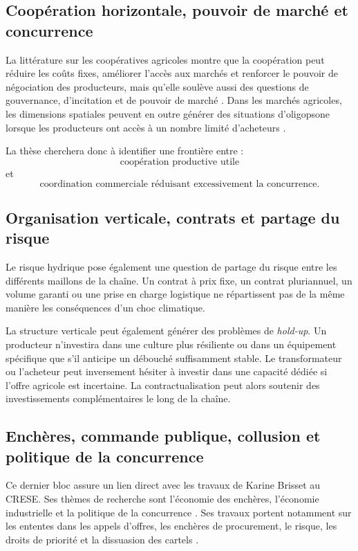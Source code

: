 \documentclass[11pt,a4paper]{article}
\begin{document}
\subsection*{Coopération horizontale, pouvoir de marché et concurrence}

La littérature sur les coopératives agricoles montre que la coopération peut réduire les coûts fixes, améliorer l'accès aux marchés et renforcer le pouvoir de négociation des producteurs, mais qu'elle soulève aussi des questions de gouvernance, d'incitation et de pouvoir de marché \citep{CandemirEtAl2021}. Dans les marchés agricoles, les dimensions spatiales peuvent en outre générer des situations d'oligopsone lorsque les producteurs ont accès à un nombre limité d'acheteurs \citep{GraubnerEtAl2021}.

La thèse cherchera donc à identifier une frontière entre :
\[
\text{coopération productive utile}
\]
et
\[
\text{coordination commerciale réduisant excessivement la concurrence}.
\]

\subsection*{Organisation verticale, contrats et partage du risque}

Le risque hydrique pose également une question de partage du risque entre les différents maillons de la chaîne. Un contrat à prix fixe, un contrat pluriannuel, un volume garanti ou une prise en charge logistique ne répartissent pas de la même manière les conséquences d'un choc climatique.

La structure verticale peut également générer des problèmes de \textit{hold-up}. Un producteur n'investira dans une culture plus résiliente ou dans un équipement spécifique que s'il anticipe un débouché suffisamment stable. Le transformateur ou l'acheteur peut inversement hésiter à investir dans une capacité dédiée si l'offre agricole est incertaine. La contractualisation peut alors soutenir des investissements complémentaires le long de la chaîne.

\subsection*{Enchères, commande publique, collusion et politique de la concurrence}

Ce dernier bloc assure un lien direct avec les travaux de Karine Brisset au CRESE. Ses thèmes de recherche sont l'économie des enchères, l'économie industrielle et la politique de la concurrence \citep{BrissetCRESE}. Ses travaux portent notamment sur les ententes dans les appels d'offres, les enchères de procurement, le risque, les droits de priorité et la dissuasion des cartels \citep{Brisset2002,BrissetThomas2004,BrissetCochardMarechal2015,BrissetPeterle2025}.
\end{document}
